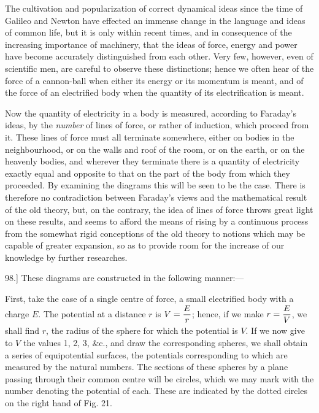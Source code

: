 \documentclass[12pt,oneside]{book}[2021/10/04]
\newcommand{\Runhead}[1]{\fancyhead[C]{\iffloatpage{}{\small#1}}}
\newcommand{\article}[1]{\phantomsection \label{art:#1}{#1.]}}
\newcommand{\xp}{\rule[-2.0ex]{0pt}{5.2ex}}
\newcommand{\¬}{\hphantom{0}}
\begin{document}
The cultivation and popularization of correct dynamical ideas
since the time of Galileo and Newton have effected an immense
change in the language and ideas of common life, but it is only
within recent times, and in consequence of the increasing importance
of machinery, that the ideas of force, energy and power
have become accurately distinguished from each other. Very few,
however, even of scientific men, are careful to observe these distinctions;
hence we often hear of the force of a cannon-ball when
either its energy or its momentum is meant, and of the force of an
electrified body when the quantity of its electrification is meant.

Now the quantity of electricity in a body is measured, according
to Faraday's ideas, by the \textit{number} of lines of force, or rather of
induction, which proceed from it. These lines of force must all
terminate somewhere, either on bodies in the neighbourhood, or on
the walls and roof of the room, or on the earth, or on the heavenly
bodies, and wherever they terminate there is a quantity of electricity
exactly equal and opposite to that on the part of the body
from which they proceeded. By examining the diagrams this will
be seen to be the case. There is therefore no contradiction between
Faraday's views and the mathematical result of the old theory,
but, on the contrary, the idea of lines of force throws great light
on these results, and seems to afford the means of rising by a continuous
process from the somewhat rigid conceptions of the old
theory to notions which may be capable of greater expansion, so
as to provide room for the increase of our knowledge by further
researches.

\article{98} These diagrams are constructed in the following manner:---
\Runhead{CONSTRUCTION OF DIAGRAMS.}

First, take the case of a single centre of force, a small electrified
body with a charge \(E\). The potential at a distance \(r\) is \(V = \xp\dfrac{E}{r}\);
hence, if we make \(r = \xp\dfrac{E}{V}\), we shall find \(r\), the radius of the sphere
for which the potential is \(V\). If we now give to \(V\) the values
1, 2, 3, \&c., and draw the corresponding spheres, we shall obtain
a series of equipotential surfaces, the potentials corresponding to
which are measured by the natural numbers. The sections of these
spheres by a plane passing through their common centre will be
circles, which we may mark with the number denoting the potential
of each. These are indicated by the dotted circles on the right
hand of Fig. 21.
\end{document}
